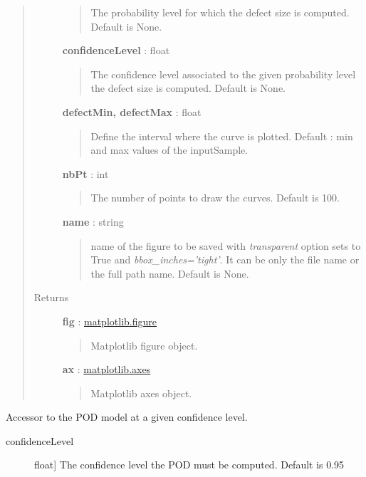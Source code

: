 \documentclass[letterpaper,10pt,english]{sphinxmanual}
\begin{document}
\begin{fulllineitems}
\begin{fulllineitems}
\begin{quote}
\begin{description}
\begin{quote}
The probability level for which the defect size is computed. Default
is None.
\end{quote}

\textbf{confidenceLevel} : float
\begin{quote}

The confidence level associated to the given probability level the
defect size is computed. Default is None.
\end{quote}

\textbf{defectMin, defectMax} : float
\begin{quote}

Define the interval where the curve is plotted. Default : min and
max values of the inputSample.
\end{quote}

\textbf{nbPt} : int
\begin{quote}

The number of points to draw the curves. Default is 100.
\end{quote}

\textbf{name} : string
\begin{quote}

name of the figure to be saved with \emph{transparent} option sets to True
and \emph{bbox\_inches='tight'}. It can be only the file name or the 
full path name. Default is None.
\end{quote}

\item[{Returns}] \leavevmode
\textbf{fig} : \href{http://matplotlib.org/api/figure\_api.html}{matplotlib.figure}
\begin{quote}

Matplotlib figure object.
\end{quote}

\textbf{ax} : \href{http://matplotlib.org/api/axes\_api.html}{matplotlib.axes}
\begin{quote}

Matplotlib axes object.
\end{quote}

\end{description}\end{quote}

\end{fulllineitems}


\begin{fulllineitems}
\label{_generated/otpod.UnivariateLinearModelPOD:otpod.UnivariateLinearModelPOD.getPODCLModel}
Accessor to the POD model at a given confidence level.
\begin{description}
\item[{confidenceLevel}] \leavevmode{[}float{]}
The confidence level the POD must be computed. Default is 0.95


\end{description}
\end{fulllineitems}
\end{fulllineitems}
\end{document}
